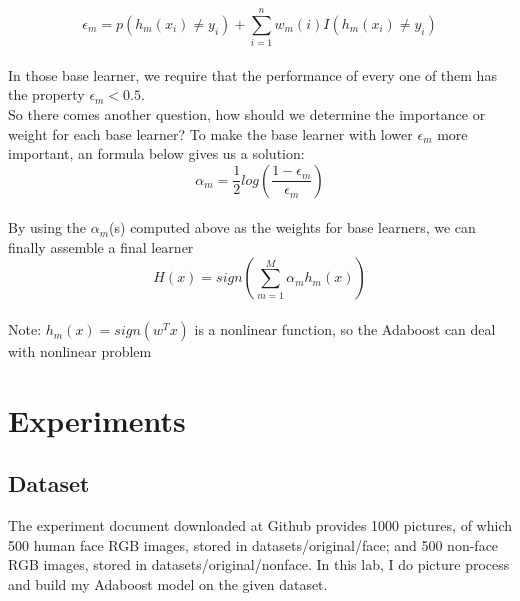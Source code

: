 \documentclass[journal, a4paper]{IEEEtran}
\begin{document}
\begin{equation}
    \epsilon_m = p(h_m(x_i) \neq y_i ) + \sum_{i=1}^n w_m(i)I(h_m(x_i) \neq y_i)
\end{equation}\\
In those base learner, we require that the performance of every one of them has the property $\epsilon_m < 0.5$.\\
So there comes another question, how should we determine the importance or weight for each base learner? To make the base learner with lower $\epsilon_m$ more important, an formula below gives us a solution:
\begin{equation}
    \alpha_m = \frac1 2 log(\frac{1-\epsilon_m}{\epsilon_m})
\end{equation}\\
By using the $\alpha_m$(s) computed above as the weights for base learners, we can finally assemble a final learner
\begin{equation}
    H(x) = sign(\sum_{m=1}^M \alpha_mh_m(x))
\end{equation}\\
Note: $h_m(x) = sign(w^Tx)$ is a nonlinear function, so the Adaboost can deal with nonlinear problem

\section{Experiments}
\subsection{Dataset}
The experiment document downloaded at Github provides 1000 pictures, of which 500 human face RGB images, stored in datasets/original/face; and 500 non-face RGB images, stored in datasets/original/nonface. In this lab, I do picture process and build my Adaboost model on the given dataset.
\end{document}
